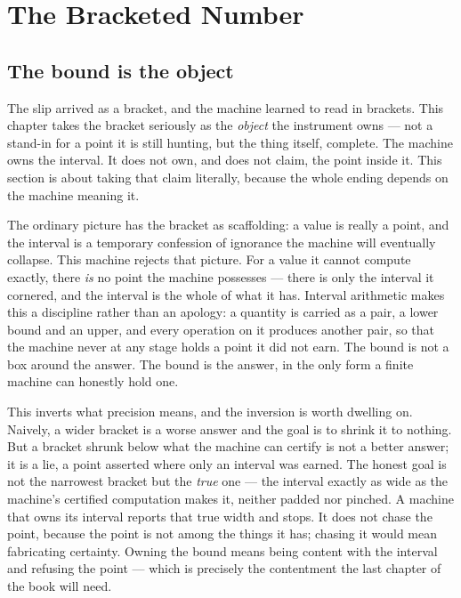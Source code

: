 \chapter{The Bracketed Number}

\section{The bound is the object}

The slip arrived as a bracket, and the machine learned to read in brackets. This chapter takes the bracket seriously as
the \emph{object} the instrument owns --- not a stand-in for a point it is still hunting, but the thing itself, complete.
The machine owns the interval. It does not own, and does not claim, the point inside it. This section is about taking
that claim literally, because the whole ending depends on the machine meaning it.

The ordinary picture has the bracket as scaffolding: a value is really a point, and the interval is a temporary
confession of ignorance the machine will eventually collapse. This machine rejects that picture. For a value it cannot
compute exactly, there \emph{is} no point the machine possesses --- there is only the interval it cornered, and the
interval is the whole of what it has. Interval arithmetic makes this a discipline rather than an apology: a quantity is
carried as a pair, a lower bound and an upper, and every operation on it produces another pair, so that the machine
never at any stage holds a point it did not earn. The bound is not a box around the answer. The bound is the answer, in
the only form a finite machine can honestly hold one.

This inverts what precision means, and the inversion is worth dwelling on. Naively, a wider bracket is a worse answer
and the goal is to shrink it to nothing. But a bracket shrunk below what the machine can certify is not a better answer;
it is a lie, a point asserted where only an interval was earned. The honest goal is not the narrowest bracket but the
\emph{true} one --- the interval exactly as wide as the machine's certified computation makes it, neither padded nor
pinched. A machine that owns its interval reports that true width and stops. It does not chase the point, because the
point is not among the things it has; chasing it would mean fabricating certainty. Owning the bound means being content
with the interval and refusing the point --- which is precisely the contentment the last chapter of the book will need.

